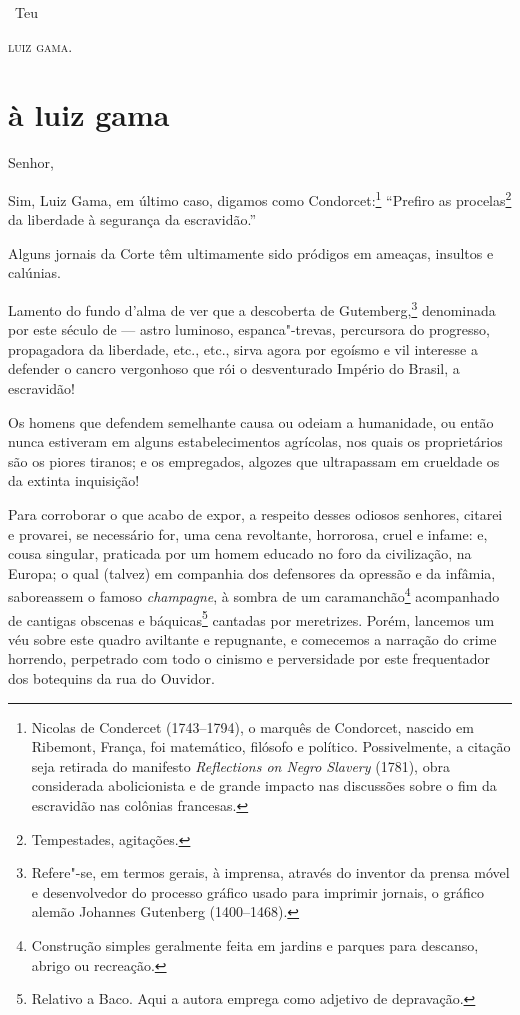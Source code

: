 \hfill\ Teu

\hfill\textsc{luiz gama.}


\section*{à luiz gama}

\noindent{}Senhor,%


Sim, Luiz Gama, em último caso, digamos como Condorcet:\footnote{
  Nicolas de Condercet (1743--1794), o marquês de Condorcet, nascido em
  Ribemont, França, foi matemático, filósofo e político. Possivelmente,
  a citação seja retirada do manifesto \emph{Reflections on Negro
  Slavery} (1781), obra considerada abolicionista e de grande impacto
  nas discussões sobre o fim da escravidão nas colônias francesas.}
``Prefiro as procelas\footnote{Tempestades, agitações.} da liberdade à
segurança da escravidão.''

Alguns jornais da Corte têm ultimamente sido pródigos em ameaças,
insultos e calúnias.

Lamento do fundo d'alma de ver que a descoberta de Gutemberg,\footnote{
  Refere"-se, em termos gerais, à imprensa, através do inventor da prensa
  móvel e desenvolvedor do processo gráfico usado para imprimir jornais,
  o gráfico alemão Johannes Gutenberg (1400--1468).} denominada por este
século de --- astro luminoso, espanca"-trevas, percursora do progresso,
propagadora da liberdade, etc., etc., sirva agora por egoísmo e vil
interesse a defender o cancro vergonhoso que rói o desventurado Império
do Brasil, a escravidão!

Os homens que defendem semelhante causa ou odeiam a humanidade, ou então
nunca estiveram em alguns estabelecimentos agrícolas, nos quais os
proprietários são os piores tiranos; e os empregados, algozes que
ultrapassam em crueldade os da extinta inquisição!

Para corroborar o que acabo de expor, a respeito desses odiosos
senhores, citarei e provarei, se necessário for, uma cena revoltante,
horrorosa, cruel e infame: e, cousa singular, praticada por um homem
educado no foro da civilização, na Europa; o qual (talvez) em companhia
dos defensores da opressão e da infâmia, saboreassem o famoso
\emph{champagne}, à sombra de um caramanchão\footnote{Construção
  simples geralmente feita em jardins e parques para descanso, abrigo ou
  recreação.} acompanhado de cantigas obscenas e báquicas\footnote{
  Relativo a Baco. Aqui a autora emprega como adjetivo de depravação.}
cantadas por meretrizes. Porém, lancemos um véu sobre este quadro
aviltante e repugnante, e comecemos a narração do crime horrendo,
perpetrado com todo o cinismo e perversidade por este frequentador dos
botequins da rua do Ouvidor.

